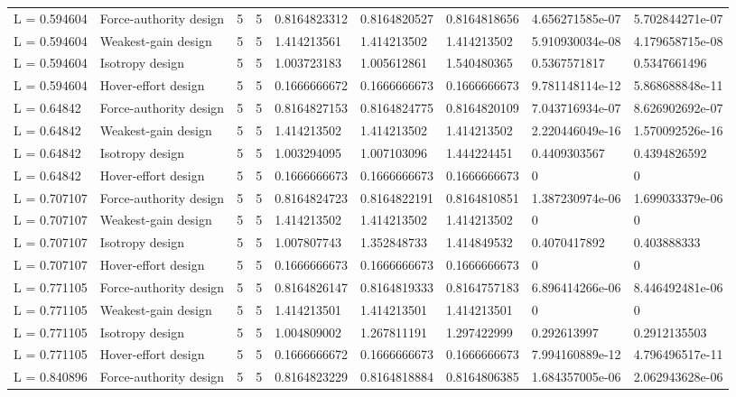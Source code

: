 \begin{tabular}{@{}lllllllll@{}}
L = 0.594604 & Force-authority design & 5 & 5 & 0.8164823312 & 0.8164820527 & 0.8164818656 & 4.656271585e-07 & 5.702844271e-07 \\
L = 0.594604 & Weakest-gain design & 5 & 5 & 1.414213561 & 1.414213502 & 1.414213502 & 5.910930034e-08 & 4.179658715e-08 \\
L = 0.594604 & Isotropy design & 5 & 5 & 1.003723183 & 1.005612861 & 1.540480365 & 0.5367571817 & 0.5347661496 \\
L = 0.594604 & Hover-effort design & 5 & 5 & 0.1666666672 & 0.1666666673 & 0.1666666673 & 9.781148114e-12 & 5.868688848e-11 \\
L = 0.64842 & Force-authority design & 5 & 5 & 0.8164827153 & 0.8164824775 & 0.8164820109 & 7.043716934e-07 & 8.626902692e-07 \\
L = 0.64842 & Weakest-gain design & 5 & 5 & 1.414213502 & 1.414213502 & 1.414213502 & 2.220446049e-16 & 1.570092526e-16 \\
L = 0.64842 & Isotropy design & 5 & 5 & 1.003294095 & 1.007103096 & 1.444224451 & 0.4409303567 & 0.4394826592 \\
L = 0.64842 & Hover-effort design & 5 & 5 & 0.1666666673 & 0.1666666673 & 0.1666666673 & 0 & 0 \\
L = 0.707107 & Force-authority design & 5 & 5 & 0.8164824723 & 0.8164822191 & 0.8164810851 & 1.387230974e-06 & 1.699033379e-06 \\
L = 0.707107 & Weakest-gain design & 5 & 5 & 1.414213502 & 1.414213502 & 1.414213502 & 0 & 0 \\
L = 0.707107 & Isotropy design & 5 & 5 & 1.007807743 & 1.352848733 & 1.414849532 & 0.4070417892 & 0.403888333 \\
L = 0.707107 & Hover-effort design & 5 & 5 & 0.1666666673 & 0.1666666673 & 0.1666666673 & 0 & 0 \\
L = 0.771105 & Force-authority design & 5 & 5 & 0.8164826147 & 0.8164819333 & 0.8164757183 & 6.896414266e-06 & 8.446492481e-06 \\
L = 0.771105 & Weakest-gain design & 5 & 5 & 1.414213501 & 1.414213501 & 1.414213501 & 0 & 0 \\
L = 0.771105 & Isotropy design & 5 & 5 & 1.004809002 & 1.267811191 & 1.297422999 & 0.292613997 & 0.2912135503 \\
L = 0.771105 & Hover-effort design & 5 & 5 & 0.1666666672 & 0.1666666673 & 0.1666666673 & 7.994160889e-12 & 4.796496517e-11 \\
L = 0.840896 & Force-authority design & 5 & 5 & 0.8164823229 & 0.8164818884 & 0.8164806385 & 1.684357005e-06 & 2.062943628e-06 \\

\end{tabular}
